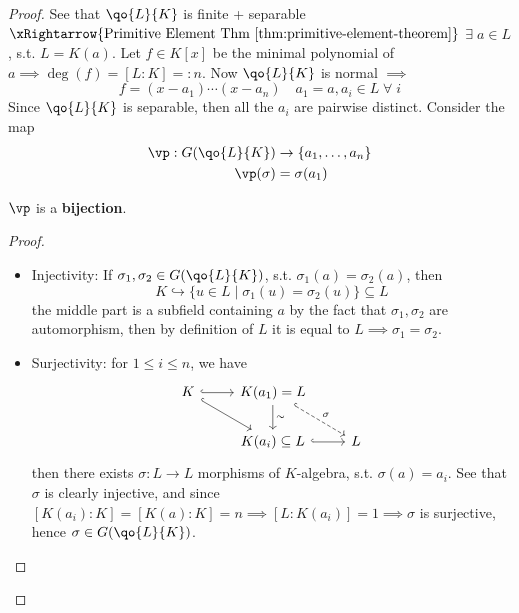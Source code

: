 \begin{proof}
	See that \( \qo{L}{K} \) is finite + separable \( \xRightarrow{\text{Primitive Element Thm \ref{thm:primitive-element-theorem}}} \)
	\( \exists \; a\in L \), s.t. \( L = K(a) \). Let \( f \in K[x] \) be the minimal polynomial of \(
	a \implies \deg(f) = [L:K] =: n \). Now \( \qo{L}{K} \) is normal \( \implies  \)
	\[
		f = (x-a_1)\cdots (x-a_n) \quad a_1 = a, a_i \in L \; \forall \; i
	\]
	Since \( \qo{L}{K} \) is separable, then all the \( a_i \) are pairwise distinct. Consider the map
	\[
		\begin{aligned}
			\vp: G(\qo{L}{K}) & \to \{a_1,\ldots, a_n\} \\
			\vp(\sigma)       & = \sigma(a_1)
		\end{aligned}
	\]
	\begin{claim}
		\( \vp \) is a \textbf{bijection}.
	\end{claim}

	\begin{proof}
		\leavevmode
		\begin{itemize}
			\item Injectivity: If \( \sigma_1, \sigma_2 \in G(\qo{L}{K}) \), s.t. \( \sigma_1(a) =
			      \sigma_2(a) \), then
			      \[
				      K \hookrightarrow \{u \in L \; | \; \sigma_1(u) = \sigma_2(u)\} \subseteq L
			      \]
			      the middle part is a subfield containing \( a \) by the fact that \( \sigma_1, \sigma_2 \)
			      are automorphism, then by definition of \( L \) it is equal to \( L
			      \implies \sigma_1 = \sigma_2 \).
			\item Surjectivity: for \( 1\leq i \leq n \), we have
			      \[
				      \begin{tikzcd}
					      K \arrow[r,hook]\arrow[rd, hook] & K(a_1) = L \arrow[d, "\sim"] \arrow[rd, dashed, hook, "\sigma"] &\\
					      & K(a_i) \subseteq L \arrow[r,hook] & L
				      \end{tikzcd}
			      \]
			      then there exists \( \sigma: L \to L \) morphisms of \( K \)-algebra, s.t. \( \sigma(a) =
			      a_i \). See that \( \sigma \) is clearly injective, and since \( [K(a_i) : K] = [K(a) : K] = n \implies
			      [L: K(a_i)] = 1 \implies \sigma \) is surjective, hence \( \sigma \in G(\qo{L}{K}) \).
		\end{itemize}
	\end{proof}
\end{proof}

